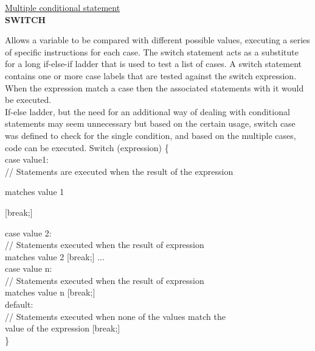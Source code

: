 \documentclass[11pt, letterpaper, english]{article}
\begin{document}
\vspace{0.5 cm}
\underline{Multiple conditional statement}\\
\textbf{SWITCH}
\par{Allows a variable to be compared with different possible values, executing a series of specific instructions for each case. The switch statement acts as a substitute for a long if-else-if ladder that is used to test a list of cases. A switch statement contains one or more case labels that are tested against the switch expression. When the expression match a case then the associated statements with it would be executed.
\\
If-else ladder, but the need for an additional way of dealing with conditional statements may seem unnecessary but based on the certain usage, switch case was defined to check for the single condition, and based on the multiple cases, code can be executed.}
\vspace{0.5 cm}
Switch (expression) \{ \\
   case value1: \\
     // Statements are executed when the result of the expression 
     
     matches value 1
     
     [break;] 
     
     \vspace{0.5 cm}
     
   case value 2: \\
     // Statements executed when the result of expression \\ matches value 2 \vspace{0.5 cm}
     [break;] 
   ... \\
   case value n:\\
     // Statements executed when the result of expression \\ matches value n \vspace{0.5 cm}
     [break;] \\
   default: \\
     // Statements executed when none of the values match the \\ value of the expression \vspace{0.5 cm}
     [break;] \\
\} \\
\end{document}
